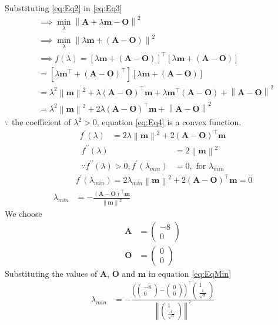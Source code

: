 \documentclass[12pt]{article}
\providecommand{\brak}[1]{\ensuremath{\left(#1\right)}}
\providecommand{\sbrak}[1]{\ensuremath{{}\left[#1\right]}}
\providecommand{\norm}[1]{\left\lVert#1\right\rVert}
\newcommand{\myvec}[1]{\ensuremath{\begin{pmatrix}#1\end{pmatrix}}}
\let\vec\mathbf
\begin{document}
\begin{enumerate}
\begin{enumerate}
Substituting \eqref{eq:Eq2} in \eqref{eq:Eq3}
\begin{align}
	& \implies \min_{\lambda} \norm{ \vec{A}+\lambda\vec{m} -\vec{O}}^2\\
	& \implies \min_{\lambda} \norm{ \lambda\vec{m} +\brak{\vec{A}-\vec{O}}}^2\\
	&\implies f\brak{\lambda} = \sbrak{\lambda\vec{m}+ \brak{\vec{A}-\vec{O}}}^\top \sbrak{\lambda\vec{m}+ \brak{\vec{A}-\vec{O}}} \\  
	&= \sbrak{\lambda\vec{m^\top}+ \brak{\vec{A}-\vec{O}}^\top} \sbrak{\lambda\vec{m}+ \brak{\vec{A}-\vec{O}}} \\  
	&= \lambda^2\norm{\vec{m}}^2+ \lambda\brak{\vec{A}-\vec{O}}^\top\vec{m}+ \lambda\vec{m}^\top\brak{\vec{A}-\vec{O}}+ \norm{\vec{A}-\vec{O}}^2 \\  
	\label{eq:Eq4}
	&= \lambda^2\norm{\vec{m}}^2+ 2\lambda\brak{\vec{A}-\vec{O}}^\top\vec{m}+  \norm{\vec{A}-\vec{O}}^2  
\end{align}
$\because$ the coefficient of $\lambda^2> 0$, equation \eqref{eq:Eq4} is a convex function.
\begin{align}
	f^\prime\brak{\lambda} &= 2\lambda\norm{\vec{m}}^2+ 2\brak{\vec{A}-\vec{O}}^\top\vec{m}
\end{align}	
\begin{align}
	f^{\prime\prime}\brak{\lambda} &= 2\norm{\vec{m}}^2 \\ 
	\because f^{\prime\prime}\brak{\lambda} > 0, f^\prime\brak{\lambda_{min}} &= 0, \text{ for } \lambda_{min}
\end{align}
\begin{align}
	& f^\prime\brak{\lambda_{min}} =  2\lambda_{min}\norm{\vec{m}}^2 + 2\brak{\vec{A}-\vec{O}}^\top\vec{m}  = 0 \\
	\label{eq:EqMin}
	\lambda_{min} &= -\frac{\brak{\vec{A}-\vec{O}}^\top\vec{m}}{\norm{\vec{m}}^2} 
\end{align}
We choose  
\begin{align}
	\vec{A} &= \myvec{-8 \\ 0}\\
	\vec{O} &= \myvec{ 0 \\ 0}
\end{align}
Substituting the values of $\vec{A}$, $\vec{O}$ and $\vec{m}$ in equation \eqref{eq:EqMin}
\begin{align}
	\lambda_{min} &= -\frac{\brak{\myvec{-8 \\ 0 }-\myvec{0 \\ 0}}^\top\myvec{1 \\ \frac{1}{\sqrt{3}}}}{\norm{\myvec{1 \\ \frac{1}{\sqrt{3}}}}^2}\\ 

\end{align}
\end{enumerate}
\end{enumerate}
\end{document}
